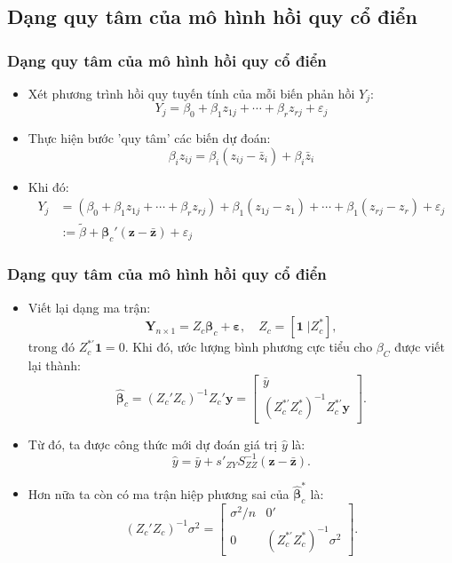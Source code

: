 \subsection{Dạng quy tâm của mô hình hồi quy cổ điển}
\begin{frame}
\frametitle{Dạng quy tâm của mô hình hồi quy cổ điển}
\begin{itemize}
	\item Xét phương trình hồi quy tuyến tính của mỗi biến phản hồi $Y_j$:
\begin{equation}
Y_j = \beta_0 + \beta_1z_{1j} + \cdots + \beta_rz_{rj} + \varepsilon_j \label{eq:93}
\end{equation}
\item Thực hiện bước 'quy tâm' các biến dự đoán:
\begin{equation}
\beta_i z_{ij} = \beta_i (z_{ij} - \bar{z}_i) + \beta_i\bar{z}_i \label{eq:94}
\end{equation}
\item Khi đó:
\begin{align*}
Y_j &= (\beta_0 + \beta_1z_{1j} + \cdots + \beta_rz_{rj}) + \beta_1(z_{1j}-z_1) + \cdots + \beta_1(z_{rj}-z_r) + \varepsilon_j \\
&:= \tilde{\beta} + \bm{\beta}_c'(\bm{z} - \bar{\bm{z}}) + \varepsilon_j
\end{align*}
\end{itemize}
\end{frame}
\begin{frame}
\frametitle{Dạng quy tâm của mô hình hồi quy cổ điển}
\begin{itemize}
\item Viết lại dạng ma 
trận:
\begin{equation}
\mathbf{Y}_{n\times1} = Z_c\bm{\beta}_c + \bm{\varepsilon}, \quad Z_c = [\mathbf{1}\;| Z_c^*],
\end{equation}
trong đó $Z_c^{*\prime}\mathbf{1} = 0$.
Khi đó, ước lượng bình phương cực tiểu cho $\beta_C$ được viết lại thành:
\begin{equation}
\hat{\bm{\beta}}_c = (Z_c'Z_c)^{-1}Z_c'\mathbf{y} = \begin{bmatrix}\bar{y} \\ (Z_c^{*\prime}Z_c^*)^{-1}Z_c^{*\prime}\mathbf{y}\end{bmatrix}.
\label{eq:96}
\end{equation}
\item Từ đó, ta được công thức mới dự đoán giá trị $\hat{y}$ là:
\begin{equation}
\hat{y} = \bar{y} + s'_{ZY}S_{ZZ}^{-1}(\bm{z} - \bar{\bm{z}}).
\label{eq:98}
\end{equation}
\item Hơn nữa ta còn có ma trận hiệp phương sai của $\hat{\bm{\beta}}_c^*$ là:
\begin{equation}
(Z_c'Z_c)^{-1}\sigma^2 = \begin{bmatrix}\sigma^2/n & 0'\\0&(Z_c^{*\prime}Z_c^*)^{-1}\sigma^2\end{bmatrix}.
\label{eq:99}
\end{equation}
\end{itemize}
\end{frame}

